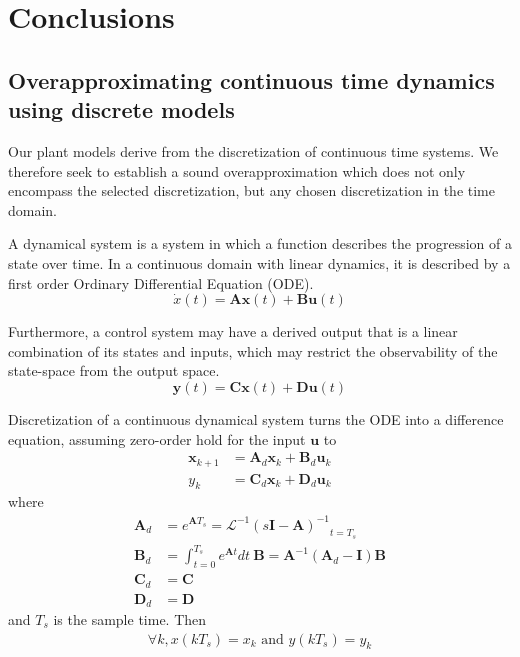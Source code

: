 \documentclass[sigconf]{llncs}
\newcommand{\mat}[1]{\boldsymbol{#1}}
\renewcommand{\vec}[1]{\boldsymbol{#1}}
\begin{document}
\section{Conclusions}
\label{sec:conclusions}

\newpage


\newpage
\appendix

\subsection{Overapproximating continuous time dynamics using discrete models}
\label{sec:cont_aa}
Our plant models derive from the discretization of
continuous time systems.  We therefore seek to establish a sound
overapproximation which does not only encompass the selected discretization,
but any chosen discretization in the time domain.

A dynamical system is a system in which a function describes the progression
of a state over time.  In a continuous domain with linear dynamics, it is
described by a first order Ordinary Differential Equation (ODE).
\begin{equation}
\dot{x}(t)=\mat{A}\vec{x}(t)+\mat{B}\vec{u}(t)%
\label{eq:dynamical}
\end{equation}

Furthermore, a control system may have a derived
output that is a linear combination of its states and inputs, which may
restrict the observability of the state-space from the output space.
\begin{equation}
\vec{y}(t)=\mat{C}\vec{x}(t)+\mat{D}\vec{u}(t)
\end{equation}

Discretization of a continuous dynamical system turns the ODE into a
difference equation, assuming zero-order hold for the input $\vec{u}$
to
\begin{align}
\label{eq:discretization}
\vec{x}_{k+1} &= \mat{A}_d\vec{x}_k+\mat{B}_d\vec{u}_k\\%
y_k &= \mat{C}_d \vec{x}_ k + \mat{D}_d \vec{u}_ k 
\end{align}
where
\begin{align}
\label{eq:discretize}
\mat{A}_d &= e^{\mat{A} T_s} = \mathcal{L}^{-1} { ( s \mat{I} - \mat{A} )^{-1} }_{t = T_s}\\
\mat{B}_d &= \int_{t = 0}^{T_s} e^{\mat{A} t} dt\ \mat{B} = \mat{A}^{-1} ( \mat{A}_d - \mat{I} ) \mat{B}\\
\mat{C}_d &= \mat{C}\\
\mat{D}_d &= \mat{D}
\end{align}
and $T_s$ is the sample time. Then
\begin{align*}
\forall k, x(kT_s)=x_k \text{ and } y(kT_s) = y_k
\end{align*}
\end{document}
